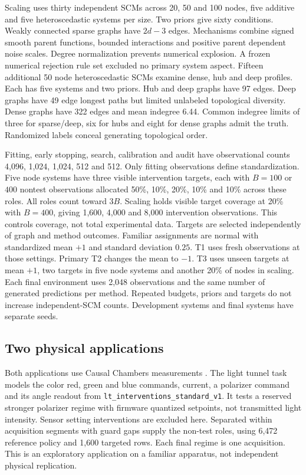 \documentclass{svproc}
\begin{document}
Scaling uses thirty independent SCMs across 20, 50 and 100 nodes, five additive
and five heteroscedastic systems per size. Two priors give sixty conditions.
Weakly connected sparse graphs have $2d-3$ edges. Mechanisms combine signed smooth
parent functions, bounded interactions and positive parent dependent noise
scales. Degree normalization prevents numerical explosion. A frozen numerical
rejection rule set excluded no primary system aspect.
Fifteen additional 50 node heteroscedastic SCMs examine dense, hub and deep
profiles. Each has five systems and two priors. Hub and deep graphs have 97
edges. Deep graphs have 49 edge longest paths but limited unlabeled topological
diversity. Dense graphs have 322 edges and mean indegree 6.44. Common indegree
limits of three for sparse/deep, six for hubs and eight for dense graphs admit
the truth. Randomized labels conceal generating topological order.

Fitting, early stopping, search, calibration and audit have observational counts
4,096, 1,024, 1,024, 512 and 512. Only fitting observations define standardization.
Five node systems have three visible intervention targets, each with $B=100$ or
$400$ nontest observations allocated 50\%, 10\%, 20\%, 10\% and 10\% across
these roles. All roles count toward $3B$. Scaling holds visible target coverage
at 20\% with $B=400$, giving 1,600, 4,000 and 8,000 intervention observations.
This controls coverage, not total experimental data. Targets are selected
independently of graph and method outcomes.
Familiar assignments are normal with standardized mean $+1$ and standard
deviation $0.25$. T1 uses fresh observations at those settings. Primary T2 changes
the mean to $-1$. T3 uses unseen targets at mean $+1$, two targets in five node
systems and another 20\% of nodes in scaling. Each final environment uses 2,048
observations and the same number of generated predictions per method. Repeated
budgets, priors and targets do not increase independent-SCM counts. Development
systems and final systems have separate seeds.



\subsection{Two physical applications}
Both applications use Causal Chambers measurements \cite{gamella2025}. The
light tunnel task models the color  red, green and blue commands, current, a polarizer
command and its angle readout from \nolinkurl{lt_interventions_standard_v1}.
It tests a reserved stronger polarizer regime with firmware quantized setpoints,
not transmitted light intensity. Sensor setting interventions are excluded here.
Separated within acquisition segments with guard gaps supply the non-test roles,
using 6,472 reference policy and 1,600 targeted rows. Each final regime is one
acquisition. This is an exploratory application on a familiar apparatus, not
independent physical replication.
\end{document}
